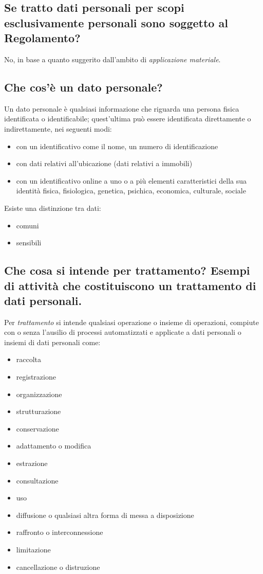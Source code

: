 \subsection{Se tratto dati personali per scopi esclusivamente personali sono soggetto al Regolamento?}
No, in base a quanto suggerito dall'ambito di \textit{applicazione materiale}.


\subsection{Che cos’è un dato personale?}
Un dato personale è qualsiasi informazione che riguarda una persona fisica identificata o identificabile;
quest'ultima può essere identificata direttamente o indirettamente, nei seguenti modi:
\begin{itemize}
    \item con un identificativo come il nome, un numero di identificazione
    \item con dati relativi all'ubicazione (dati relativi a immobili)
    \item con un identificativo online a uno o a più elementi caratteristici della sua identità fisica, fisiologica, genetica, psichica, economica, culturale, sociale
\end{itemize}
Esiste una distinzione tra dati:
\begin{itemize}
    \item comuni
    \item sensibili
\end{itemize}

\subsection{Che cosa si intende per trattamento? Esempi di attività che costituiscono un trattamento di
dati personali.}
Per \textit{trattamento} si intende qualsiasi operazione o insieme di operazioni, compiute con o senza l'ausilio di processi automatizzati e applicate a dati personali o insiemi di dati personali come:
\begin{itemize}
    \item raccolta
    \item registrazione
    \item organizzazione
    \item strutturazione
    \item conservazione
    \item adattamento o modifica
    \item estrazione
    \item consultazione
    \item uso
    \item diffusione o qualsiasi altra forma di messa a disposizione
    \item raffronto o interconnessione
    \item limitazione
    \item cancellazione o distruzione
\end{itemize}

